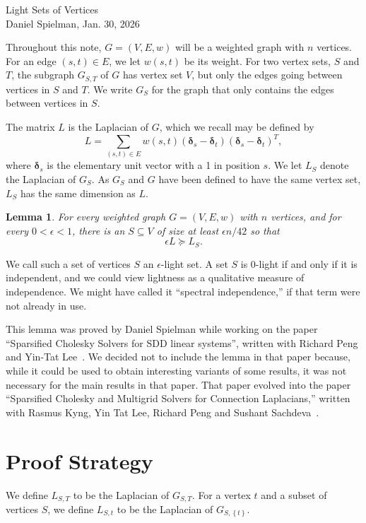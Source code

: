 \documentclass[11pt]{article}
\def\ddelta{\boldsymbol{\delta}}
\def\pgeq{\succcurlyeq}
\def\setof#1{\left\{#1  \right\}}
\newtheorem{lemma}[theorem]{Lemma}
\begin{document}
\begin{center}
{\Large Light Sets of Vertices\\
Daniel Spielman, Jan. 30, 2026}
\end{center}

Throughout this note, $G = (V,E,w)$ will be a weighted graph with $n$ vertices. 
For an edge $(s,t) \in E$, we let $w(s,t)$ be its weight.
For two vertex sets, $S$ and $T$, the subgraph $G_{S,T}$ of $G$ has vertex set $V$,
  but only the edges going between vertices in $S$ and $T$.
We write $G_{S}$ for the graph that only contains the edges between vertices in $S$.

The matrix $L$ is the Laplacian of $G$, which we recall may be defined by
\[
  L = \sum_{(s,t) \in E} w(s,t) (\ddelta_s - \ddelta_t) (\ddelta_s - \ddelta_t)^T,
\]
where $\ddelta_s$ is the elementary unit vector with a 1 in position $s$.
We let $L_{S}$ denote the Laplacian of $G_{S}$.
As $G_{S}$ and $G$ have been defined to have the same vertex set,
  $L_{S}$ has the same dimension as $L$.

\begin{lemma}\label{lem:light}
For every weighted graph $G = (V,E,w)$ with $n$ vertices, and for every $0 < \epsilon < 1$,
  there is an $S \subseteq V$ of size at least $\epsilon n / 42$
  so that
\[
  \epsilon L \pgeq  L_{S} .
\]
\end{lemma}

We call such a set of vertices $S$ an $\epsilon$-light set.
A set $S$ is $0$-light if and only if it is independent, and we could view lightness as a qualitative measure of independence.
We might have called it ``spectral independence,'' if that term were not already in use.


This lemma was proved by Daniel Spielman while working on the paper ``Sparsified Cholesky Solvers for SDD linear systems'', written with Richard Peng and Yin-Tat Lee~\cite{LeePengSpielman}. 
We decided not to include the lemma in that paper because, while it could be used to obtain interesting variants of some results, it was not necessary for the main results in that paper.
That paper evolved into the paper ``Sparsified Cholesky and Multigrid Solvers for Connection Laplacians,'' written with Rasmus Kyng, Yin Tat Lee, Richard Peng and Sushant Sachdeva~\cite{kyng2016sparsified}. 










\section{Proof Strategy}
We define $L_{S,T}$ to be the Laplacian of $G_{S,T}$.
For a vertex $t$ and a subset of vertices $S$, we define $L_{S,t}$ to be the Laplacian of $G_{S , \setof{t}}$.
\end{document}
